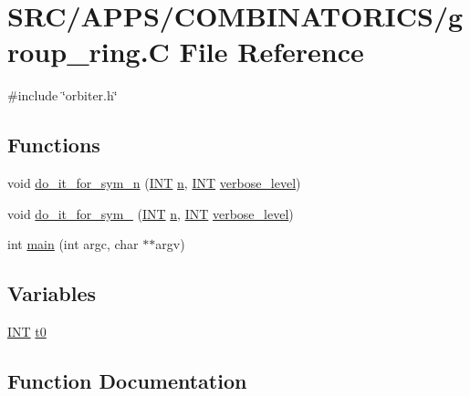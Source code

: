 \hypertarget{group__ring_8_c}{}\section{S\+R\+C/\+A\+P\+P\+S/\+C\+O\+M\+B\+I\+N\+A\+T\+O\+R\+I\+C\+S/group\+\_\+ring.C File Reference}
\label{group__ring_8_c}
{\ttfamily \#include \char`\"{}orbiter.\+h\char`\"{}}\newline
\subsection*{Functions}
\begin{DoxyCompactItemize}
\item 
void \mbox{\hyperlink{group__ring_8_c_a7da1c84aee65e2c8fd4b83f0809835ad}{do\+\_\+it\+\_\+for\+\_\+sym\+\_\+n}} (\mbox{\hyperlink{galois_8h_a09fddde158a3a20bd2dcadb609de11dc}{I\+NT}} \mbox{\hyperlink{simeon_8_c_a7f2cd26777ce0ff3fdaf8d02aacbddfb}{n}}, \mbox{\hyperlink{galois_8h_a09fddde158a3a20bd2dcadb609de11dc}{I\+NT}} \mbox{\hyperlink{simeon_8_c_a818073fbcc2f439e7c56952f67386122}{verbose\+\_\+level}})
\item 
void \mbox{\hyperlink{group__ring_8_c_aed9b25712c762c878090038e97568d07}{do\+\_\+it\+\_\+for\+\_\+sym\+\_}} (\mbox{\hyperlink{galois_8h_a09fddde158a3a20bd2dcadb609de11dc}{I\+NT}} \mbox{\hyperlink{simeon_8_c_a7f2cd26777ce0ff3fdaf8d02aacbddfb}{n}}, \mbox{\hyperlink{galois_8h_a09fddde158a3a20bd2dcadb609de11dc}{I\+NT}} \mbox{\hyperlink{simeon_8_c_a818073fbcc2f439e7c56952f67386122}{verbose\+\_\+level}})
\item 
int \mbox{\hyperlink{group__ring_8_c_a3c04138a5bfe5d72780bb7e82a18e627}{main}} (int argc, char $\ast$$\ast$argv)
\end{DoxyCompactItemize}
\subsection*{Variables}
\begin{DoxyCompactItemize}
\item 
\mbox{\hyperlink{galois_8h_a09fddde158a3a20bd2dcadb609de11dc}{I\+NT}} \mbox{\hyperlink{group__ring_8_c_a4268f4fe222ffb119218a0199f5e1904}{t0}}
\end{DoxyCompactItemize}


\subsection{Function Documentation}
\mbox{\label{group__ring_8_c_aed9b25712c762c878090038e97568d07}} 
